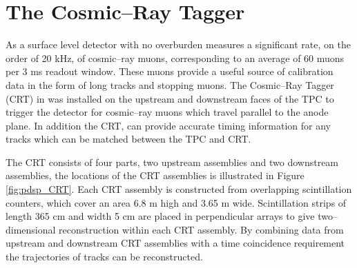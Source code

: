 \section{The Cosmic--Ray Tagger} \label{sec:pdsp_cosmic}

As a surface level detector with no overburden \protodune{} measures a
significant rate, on the order of 20 kHz, of cosmic--ray muons, corresponding 
to an average of 60 muons per 3 ms readout window. These muons provide a 
useful source of calibration data in the form of long tracks and stopping 
muons.  The Cosmic--Ray Tagger (CRT) in \protodune{} was installed on the 
upstream and downstream faces of the TPC to trigger the detector for 
cosmic--ray muons which travel parallel to the anode plane. In addition the 
CRT, can provide accurate timing information for any tracks which can be matched
between the TPC and CRT.

The CRT consists of four parts, two upstream assemblies and two downstream
assemblies, the locations of the CRT assemblies is illustrated in Figure
\ref{fig:pdsp_CRT}. Each CRT assembly is constructed from overlapping 
scintillation counters, which cover an area 6.8 m high and 3.65 m wide. 
Scintillation strips of length 365 cm and width 5 cm are placed in 
perpendicular arrays to give two--dimensional reconstruction within each CRT 
assembly. By combining data from upstream and downstream CRT assemblies with a 
time coincidence requirement the trajectories of tracks can be reconstructed.

